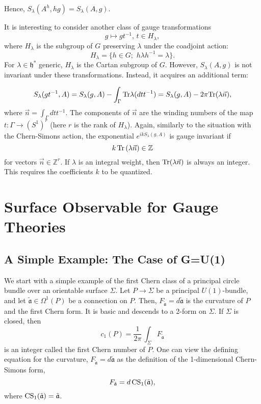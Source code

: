 \documentclass[11pt]{report}
\theoremstyle{plain}
\theoremstyle{definition}
\theoremstyle{remark}
\theoremstyle{remark}
\numberwithin{equation}{section}
\begin{document}
Hence,  $S_\lambda (A^h, hg) = S_\lambda(A,g)$.

It is interesting to consider another class of gauge transformations
%
$$ g \mapsto gt^{-1}, \, t \in H_\lambda,  
$$
where $H_\lambda$ is the subgroup of $G$ preserving $\lambda$ under the coadjoint action:
%
$$
H_\lambda = \{ h \in G; \,\, h \lambda h^{-1} =\lambda \} .
$$
For $\lambda \in \mathfrak{h}^*$ generic, $H_\lambda$ is the Cartan subgroup of $G$.
However, $S_\lambda(A,g)$  is not invariant under these transformations. 
Instead, it acquires an additional term:

\begin{equation} 
S_\lambda(gt^{-1}, A)  =  S_\lambda(g, A) - \int_{\Gamma} {\rm Tr}\lambda(dtt^{-1}) =  S_\lambda(g, A)  - 2 \pi {\rm Tr}(\lambda \vec{n}),
\end{equation}
where $\vec{n}=\int_\Gamma dtt^{-1}$. The components of $\vec{n}$ are the winding numbers of the map $t: \Gamma \to (S^1)^r$
(here $r$ is the rank of $H_\lambda$).
Again, similarly to the situation with the Chern-Simons action, the exponential $e^{ikS_\lambda(g, A)}$ is gauge invariant if 
%
$$
k\, {\rm Tr} \, (\lambda \vec{n}) \in \mathbb{Z} 
$$
for vectors $\vec{n}\in \mathbb{Z}^r$.
If $\lambda$ is an integral weight, then ${\rm Tr}(\lambda \vec{n})$ is always an integer. This requires the coefficients $k$ to be quantized.








\chapter{Surface Observable for Gauge Theories}\label{research}
\section{A Simple Example: The Case of G=U(1)}\label{2}

		We start with a simple example of the first Chern class of a principal circle bundle over an orientable surface $\Sigma$. Let $P \to \Sigma$ be a principal $U(1)$-bundle, and let $\mathfrak{\tilde{a}}\in \Omega^1(P)$ be a connection on $P$. Then, $F_\mathfrak{\tilde{a}} = d\mathfrak{\tilde{a}}$ is the curvature of $P$ and the first Chern form. It is basic and descends to a 2-form on $\Sigma$. If $\Sigma$ is closed, then
%
$$
c_1(P) = \frac{1}{2\pi} \, \int_\Sigma F_\mathfrak{\tilde{a}} 
$$
is an integer called the first Chern number of $P$. One can view the defining equation for the curvature, $F_\mathfrak{\tilde{a}} = d \mathfrak{\tilde{a}}$ as the definition of the 1-dimensional Chern-Simons form,
%
$$
F_\mathfrak{\tilde{a}}= d \,  {\rm CS}_1(\mathfrak{\tilde{a}}),
$$
where ${\rm CS}_1(\mathfrak{\tilde{a}})=\mathfrak{\tilde{a}}$.
\end{document}
